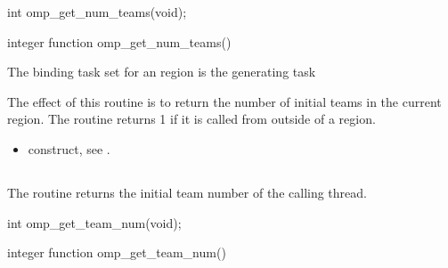\pagebreak
\format
\begin{ccppspecific}
\begin{boxedcode}
int omp\_get\_num\_teams(void);
\end{boxedcode}
\end{ccppspecific}

\begin{fortranspecific}
\begin{boxedcode}
integer function omp\_get\_num\_teams()
\end{boxedcode}
\end{fortranspecific}

\binding
The binding task set for an  region is the generating task

\effect
The effect of this routine is to return the number of initial teams in the current  region. 
The routine returns 1 if it is called from outside of a  region.

\crossreferences
\begin{itemize}
\item {} construct, see 
. 
\end{itemize}











\subsection{}
\label{subsec:omp_get_team_num}
\summary
The  routine returns the initial team number of the calling thread.

\format
\begin{ccppspecific}
\begin{boxedcode}
int omp\_get\_team\_num(void);
\end{boxedcode}
\end{ccppspecific}

\newpage %

\begin{fortranspecific}
\begin{boxedcode}
integer function omp\_get\_team\_num()
\end{boxedcode}
\end{fortranspecific}

